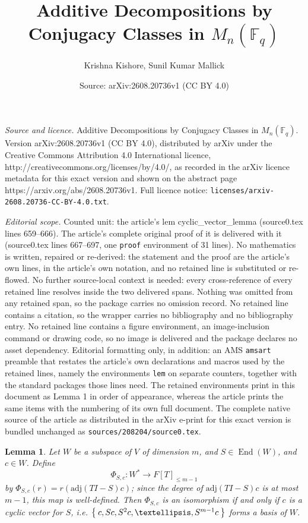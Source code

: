 \documentclass[10pt,a4paper]{amsart}
\title{Additive Decompositions by Conjugacy Classes in $M_n(\mathbb{F}_q)$}
\author{Krishna Kishore, Sunil Kumar Mallick}
\date{Source: arXiv:2608.20736v1 (CC BY 4.0)}
\newtheorem{lem}{Lemma}
\newcommand{\End}{\operatorname{End}}
\newcommand{\adj}{\textrm{adj}}
\begin{document}
\maketitle

\noindent\emph{Source and licence.} Additive Decompositions by Conjugacy Classes in $M_n(\mathbb{F}_q)$. Version arXiv:2608.20736v1 (CC BY 4.0), distributed by arXiv under the Creative Commons Attribution 4.0 International licence, http://creativecommons.org/licenses/by/4.0/, as recorded in the arXiv licence metadata for this exact version and shown on the abstract page https://arxiv.org/abs/2608.20736v1. Full licence notice: \texttt{licenses/arxiv-2608.20736-CC-BY-4.0.txt}.\par\smallskip

\noindent\textit{Editorial scope.} Counted unit: the article's lem cyclic\_vector\_lemma (source0.tex lines 659--666). The article's complete original proof of it is delivered with it (source0.tex lines 667--697, one \texttt{proof} environment of 31 lines). No mathematics is written, repaired or re-derived: the statement and the proof are the article's own lines, in the article's own notation, and no retained line is substituted or re-flowed.  No further source-local context is needed: every cross-reference of every retained line resolves inside the two delivered spans.  Nothing was omitted from any retained span, so the package carries no omission record.  No retained line contains a citation, so the wrapper carries no bibliography and no bibliography entry.  No retained line contains a figure environment, an image-inclusion command or drawing code, so no image is delivered and the package declares no asset dependency.  Editorial formatting only, in addition: an AMS \texttt{amsart} preamble that restates the article's own declarations and macros used by the retained lines, namely the environments \texttt{lem} on separate counters, together with the standard packages those lines need.  The retained environments print in this document as Lemma 1 in order of appearance, whereas the article prints the same items with the numbering of its own full document.  The complete native source of the article as distributed in the arXiv e-print for this exact version is bundled unchanged as \texttt{sources/208204/source0.tex}.
\begin{lem}\label{cyclic_vector_lemma}
Let $W$ be a subspace of $V$ of dimension $m$, and $S \in \End(W)$, and $c \in W$. Define
$$
\Phi_{S,c} : W^* \to F[T]_{\leq m-1}
$$
by $\Phi_{S,c}(r) = r(\adj(TI-S)c)$; since the degree of $\adj(TI-S)c$ is at most $m-1$, this map is well-defined.
Then $\Phi_{S,c}$ is an isomorphism if and only if $c$ is a cyclic vector for $S$, i.e. $\Set{c, Sc, S^2 c, \ldots, S^{m-1}c}$ forms a basis of $W$.
\end{lem}
\end{document}
